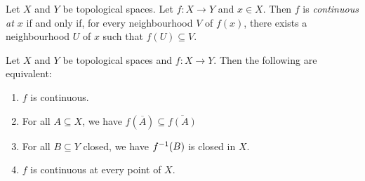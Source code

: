 \begin{definition}
    Let $X$ and $Y$ be topological spaces. Let $f : X \rightarrow Y$ and $x \in X$. Then $f$ is
    \emph{continuous at $x$} if and only if, for every neighbourhood $V$ of $f(x)$, there exists a
    neighbourhood $U$ of $x$ such that $f(U) \subseteq V$.
\end{definition}

\begin{theorem}
    \label{theorem:continuous}
    Let $X$ and $Y$ be topological spaces and $f : X \rightarrow Y$. Then the following are equivalent:
    \begin{enumerate}
        \item $f$ is continuous.
        \item For all $A \subseteq X$, we have $f(\overline{A}) \subseteq \overline{f(A)}$
        \item For all $B \subseteq Y$ closed, we have ${f}^{-1}(B)$ is closed in $X$.
        \item $f$ is continuous at every point of $X$.
    \end{enumerate}
\end{theorem}

